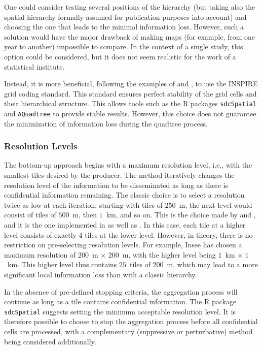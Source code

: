 One could consider testing several positions of the hierarchy (but taking also the  spatial hierarchy formally assumed for publication purposes into account) and choosing the one that leads to the minimal information loss. However, such a solution would have the major drawback of making maps (for example, from one year to another) impossible to compare. In the context of a single study, this option could be considered, but it does not seem realistic for the work of a statistical institute.

Instead, it is more beneficial, following the examples of \cite{Behnisch_Meinel_Tramsen_Diesselmann_2013} and \cite{Lagonigro_Oller_Martori_2017}, to use the INSPIRE grid coding standard. This standard ensures perfect stability of the grid cells and their hierarchical structure. This allows tools such as the R packages \texttt{sdcSpatial} \citep{sdcSpatial_2022} and \texttt{AQuadtree} \citep{AQuadtree_2023} to provide stable results. However, this choice does not guarantee the minimization of information loss during the quadtree process.


\subsubsection{Resolution Levels}

The bottom-up approach begins with a maximum resolution level, i.e., with the smallest tiles desired by the producer. The method iteratively changes the resolution level of the information to be disseminated as long as there is confidential information remaining. The classic choice is to select a resolution twice as low at each iteration: starting with tiles of $250$~m, the next level would consist of tiles of $500$~m, then $1$~km, and so on. This is the choice made by \citet{Behnisch_Meinel_Tramsen_Diesselmann_2013} and \citet{Lagonigro_Oller_Martori_2017}, and it is the one implemented in \citet{sdcSpatial_2022} as well as \citet{AQuadtree_2023}. In this case, each tile at a higher level consists of exactly 4 tiles at the lower level. However, in theory, there is no restriction on pre-selecting resolution levels. For example, Insee has chosen a maximum resolution of $200$~m $\times$ $200$~m, with the higher level being $1$~km $\times$ $1$~km. This higher level thus contains $25$~tiles of $200$~m, which may lead to a more significant local information loss than with a classic hierarchy.

In the absence of pre-defined stopping criteria, the aggregation process will continue as long as a tile contains confidential information. The R package \texttt{sdcSpatial} \citep{sdcSpatial_2022} suggests setting the minimum acceptable resolution level. It is therefore possible to choose to stop the aggregation process before all confidential cells are processed, with a complementary (suppressive or perturbative) method being considered additionally.

